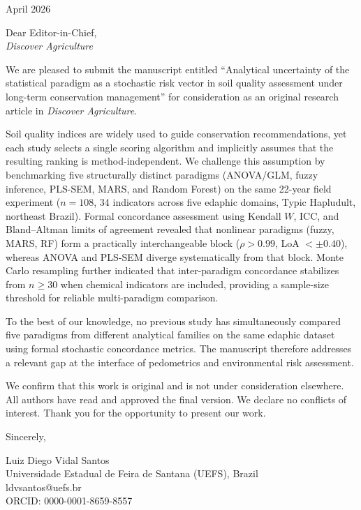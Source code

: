 \documentclass[12pt,a4paper]{article}
\begin{document}
 April 2026

\bigskip

\noindent
Dear Editor-in-Chief,\\
\textit{Discover Agriculture}

\bigskip

\noindent
We are pleased to submit the manuscript entitled ``Analytical uncertainty of the statistical paradigm as a stochastic risk vector in soil quality assessment under long-term conservation management'' for consideration as an original research article in \textit{Discover Agriculture}.

\medskip

\noindent
Soil quality indices are widely used to guide conservation recommendations, yet each study selects a single scoring algorithm and implicitly assumes that the resulting ranking is method-independent. We challenge this assumption by benchmarking five structurally distinct paradigms (ANOVA/GLM, fuzzy inference, PLS-SEM, MARS, and Random Forest) on the same 22-year field experiment ($n = 108$, 34 indicators across five edaphic domains, Typic Hapludult, northeast Brazil). Formal concordance assessment using Kendall $W$, ICC, and Bland--Altman limits of agreement revealed that nonlinear paradigms (fuzzy, MARS, RF) form a practically interchangeable block ($\rho > 0.99$, LoA $< \pm 0.40$), whereas ANOVA and PLS-SEM diverge systematically from that block. Monte Carlo resampling further indicated that inter-paradigm concordance stabilizes from $n \geq 30$ when chemical indicators are included, providing a sample-size threshold for reliable multi-paradigm comparison.

\medskip

\noindent
To the best of our knowledge, no previous study has simultaneously compared five paradigms from different analytical families on the same edaphic dataset using formal stochastic concordance metrics. The manuscript therefore addresses a relevant gap at the interface of pedometrics and environmental risk assessment.

\medskip

\noindent
We confirm that this work is original and is not under consideration elsewhere. All authors have read and approved the final version. We declare no conflicts of interest. Thank you for the opportunity to present our work.

\bigskip

\noindent
Sincerely,

\bigskip\bigskip

\noindent
Luiz Diego Vidal Santos\\
Universidade Estadual de Feira de Santana (UEFS), Brazil\\
ldvsantos@uefs.br\\
ORCID: 0000-0001-8659-8557
\end{document}
